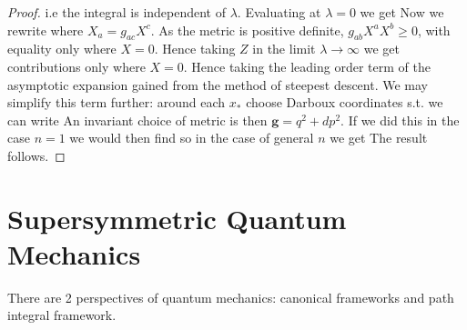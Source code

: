 \documentclass{article}
\begin{document}
\begin{proof}
{}
i.e the integral is independent of $\lambda$. Evaluating at $\lambda=0$ we get 
Now we rewrite 
where $X_a = g_{ac}X^c$. As the metric is positive definite, $g_{ab}X^a X^b \geq 0$, with equality only where $X=0$. Hence taking $Z$ in the limit $\lambda \to \infty$ we get contributions only where $X = 0$. Hence taking the leading order term of the asymptotic expansion gained from the method of steepest descent.
We may simplify this term further: around each $x_\ast$ choose Darboux coordinates s.t. we can write 
An invariant choice of metric is then $\bm{g} = q^2 + dp^2$. If we did this in the case $n=1$ we would then find 
so in the case of general $n$ we get
The result follows. 
\end{proof}
\section{Supersymmetric Quantum Mechanics}
There are 2 perspectives of quantum mechanics: canonical frameworks and path integral framework. 
\end{document}
